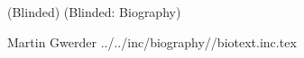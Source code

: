 \documentclass[10pt,journal,compsoc,twocolumn,twoside]{IEEEtran}
\begin{document}
% 
\ifCLASSOPTIONpeerreview
\begin{IEEEbiography}{(Blinded)}
	(Blinded: Biography)
\end{IEEEbiography}
\else
\gdef\bioloc{../../inc/biography/}
\begin{IEEEbiography}{Martin Gwerder}
   \bioloc/biotext.inc.tex
\end{IEEEbiography}
\fi








\end{document}
